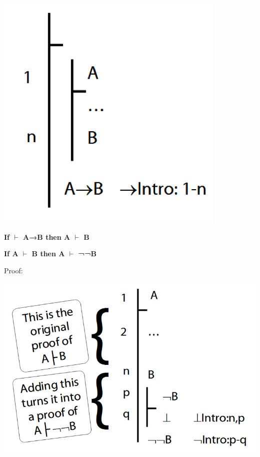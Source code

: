 \documentclass[12pt]{extarticle}
\begin{document}
\begin{multicols*}{3}
\begin{minipage}{\columnwidth}
\begin{center}
\includegraphics[scale=0.3]{img/unit_440_b.png}
\end{center}
\end{minipage}
 
\textbf{If $\vdash$ A→B then A $\vdash$ B}
 
\begin{minipage}{\columnwidth}
 
\textbf{If A $\vdash$ B then A $\vdash$ ¬¬B}
 
Proof:
 
\begin{center}
\includegraphics[scale=0.3]{img/unit_440_c.png}
\end{center}
\end{minipage}
 

\end{multicols*}
\end{document}
